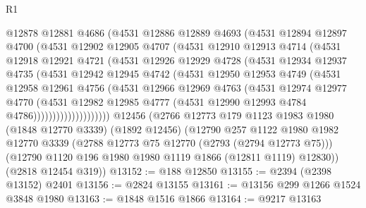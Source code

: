 \begin{lexlean}{R1}
\begin{coremodule}
                @12878
                @12881
                @4686
                (@4531
                  @12886
                  @12889
                  @4693
                  (@4531
                    @12894
                    @12897
                    @4700
                    (@4531
                      @12902
                      @12905
                      @4707
                      (@4531
                        @12910
                        @12913
                        @4714
                        (@4531
                          @12918
                          @12921
                          @4721
                          (@4531
                            @12926
                            @12929
                            @4728
                            (@4531
                              @12934
                              @12937
                              @4735
                              (@4531
                                @12942
                                @12945
                                @4742
                                (@4531
                                  @12950
                                  @12953
                                  @4749
                                  (@4531
                                    @12958
                                    @12961
                                    @4756
                                    (@4531
                                      @12966
                                      @12969
                                      @4763
                                      (@4531
                                        @12974
                                        @12977
                                        @4770
                                        (@4531
                                          @12982
                                          @12985
                                          @4777
                                          (@4531 @12990 @12993 @4784 @4786))))))))))))))))))))
    @12456
    (@2766
      @12773
      @179
      @1123
      @1983
      @1980
      (@1848 @12770 @3339)
      (@1892 @12456)
      (@12790
        @257
        @1122
        @1980
        @1982
        @12770
        @3339
        (@2788 @12773 @75 @12770 (@2793 (@2794 @12773 @75)))
        (@12790 @1120 @196 @1980 @1980 @1119 @1866 (@12811 @1119) @12830))
      (@2818 @12454 @319))
@13152 := @188 @12850
@13155 := @2394 (@2398 @13152) @2401
@13156 := @2824 @13155
@13161 := @13156 @299 @1266 @1524 @3848 @1980
@13163 := @1848 @1516 @1866
@13164 := @9217 @13163

\end{coremodule}
\end{lexlean}
